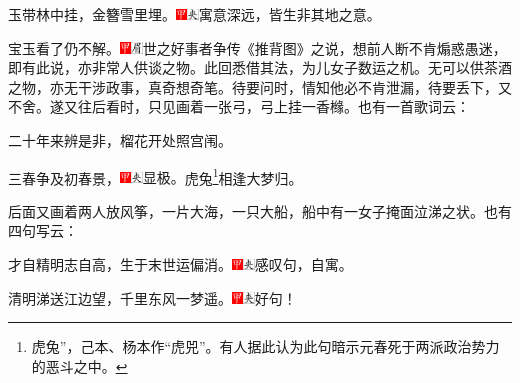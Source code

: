 玉带林中挂，金簪雪里埋。{\includegraphics[width=3mm]{../Images/00002}\includegraphics[width=3mm]{../Images/00012}\footnotesize \kaishu 寓意深远，皆生非其地之意。}

宝玉看了仍不解。{\includegraphics[width=3mm]{../Images/00002}\includegraphics[width=3mm]{../Images/00010}\footnotesize \kaishu 世之好事者争传《推背图》之说，想前人断不肯煽惑愚迷，即有此说，亦非常人供谈之物。此回悉借其法，为儿女子数运之机。无可以供茶酒之物，亦无干涉政事，真奇想奇笔。}待要问时，情知他必不肯泄漏，待要丢下，又不舍。遂又往后看时，只见画着一张弓，弓上挂一香橼。也有一首歌词云：

二十年来辨是非，榴花开处照宫闱。

三春争及初春景，{\includegraphics[width=3mm]{../Images/00002}\includegraphics[width=3mm]{../Images/00012}\footnotesize \kaishu 显极。}虎兔\footnote{虎兔”，己本、杨本作“虎兕”。有人据此认为此句暗示元春死于两派政治势力的恶斗之中。}相逢大梦归。

后面又画着两人放风筝，一片大海，一只大船，船中有一女子掩面泣涕之状。也有四句写云：

才自精明志自高，生于末世运偏消。{\includegraphics[width=3mm]{../Images/00002}\includegraphics[width=3mm]{../Images/00012}\footnotesize \kaishu 感叹句，自寓。}

清明涕送江边望，千里东风一梦遥。{\includegraphics[width=3mm]{../Images/00002}\includegraphics[width=3mm]{../Images/00012}\footnotesize \kaishu 好句！}

